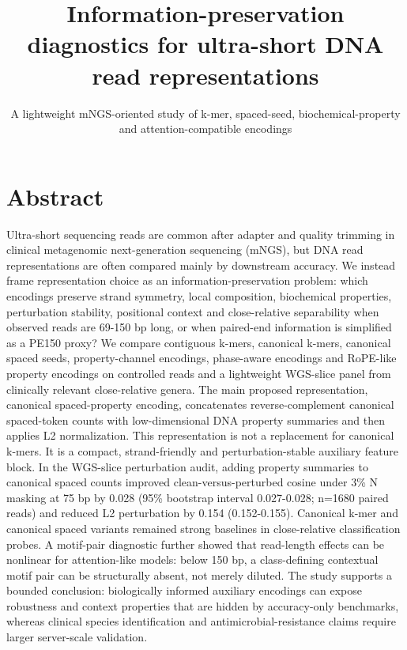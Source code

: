 \documentclass[11pt]{article}
\begin{document}
\title{\Large Information-preservation diagnostics for ultra-short DNA read representations}

\author{\small A lightweight mNGS-oriented study of k-mer, spaced-seed, biochemical-property and attention-compatible encodings}

\date{}

\maketitle

\section*{Abstract}

Ultra-short sequencing reads are common after adapter and quality trimming in clinical metagenomic next-generation sequencing (mNGS), but DNA read representations are often compared mainly by downstream accuracy. We instead frame representation choice as an information-preservation problem: which encodings preserve strand symmetry, local composition, biochemical properties, perturbation stability, positional context and close-relative separability when observed reads are 69-150 bp long, or when paired-end information is simplified as a PE150 proxy? We compare contiguous k-mers, canonical k-mers, canonical spaced seeds, property-channel encodings, phase-aware encodings and RoPE-like property encodings on controlled reads and a lightweight WGS-slice panel from clinically relevant close-relative genera. The main proposed representation, canonical spaced-property encoding, concatenates reverse-complement canonical spaced-token counts with low-dimensional DNA property summaries and then applies L2 normalization. This representation is not a replacement for canonical k-mers. It is a compact, strand-friendly and perturbation-stable auxiliary feature block. In the WGS-slice perturbation audit, adding property summaries to canonical spaced counts improved clean-versus-perturbed cosine under 3\% N masking at 75 bp by 0.028 (95\% bootstrap interval 0.027-0.028; n=1680 paired reads) and reduced L2 perturbation by 0.154 (0.152-0.155). Canonical k-mer and canonical spaced variants remained strong baselines in close-relative classification probes. A motif-pair diagnostic further showed that read-length effects can be nonlinear for attention-like models: below 150 bp, a class-defining contextual motif pair can be structurally absent, not merely diluted. The study supports a bounded conclusion: biologically informed auxiliary encodings can expose robustness and context properties that are hidden by accuracy-only benchmarks, whereas clinical species identification and antimicrobial-resistance claims require larger server-scale validation.
\end{document}
